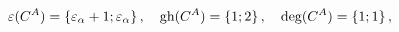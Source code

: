 \begin{equation}
\varepsilon(C^{A})=\left\{\varepsilon_{\alpha} +1;
\varepsilon_{\alpha}\right\},\quad
\hbox{gh}(C^{A})=\left\{1;2\right\},\quad
\hbox{deg}(C^{A})=\left\{1;1\right\},\label{3.32}
\end{equation}

